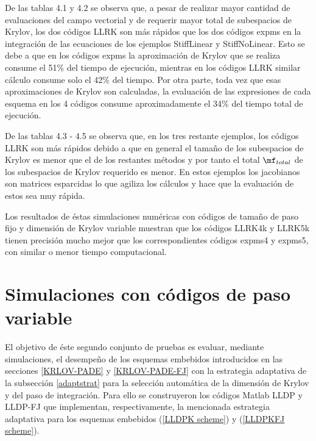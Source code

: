 De las tablas 4.1 y 4.2 se observa que, a pesar de realizar mayor cantidad de evaluaciones del campo vectorial y de requerir mayor total de subespacios de Krylov, los dos códigos LLRK son más rápidos que los dos códigos expms en la integración de las ecuaciones de los ejemplos StiffLinear y StiffNoLinear. Esto se debe a que en los códigos expms la aproximación de Krylov que se realiza consume el 51\% del tiempo de ejecución, mientras en los códigos LLRK similar cálculo consume solo el 42\% del tiempo. Por otra parte, toda vez que esas aproximaciones de Krylov son calculadas, la evaluación de las expresiones de cada esquema en los 4 códigos consume aproximadamente el 34\% del tiempo total de ejecución.

De las tablas 4.3 - 4.5 se observa que, en los tres restante ejemplos, los códigos LLRK son m\'as r\'apidos debido a que en general el tama\~no de los subespacios de Krylov es menor que el de los restantes m\'etodos y por tanto el total $\mf_{total}$ de los subespacios de Krylov requerido es menor. En estos ejemplos los jacobianos son matrices esparcidas lo que agiliza los c\'alculos y hace que la evaluaci\'on de estos sea muy r\'apida.


Los resultados de éstas simulaciones numéricas con códigos de tamaño de paso fijo y dimensión de Krylov variable muestran que los códigos LLRK4k y LLRK5k tienen precisión mucho mejor que los correspondientes c\'odigos expms4 y expms5, con similar o menor tiempo computacional.






%

\newpage

\section{Simulaciones con códigos de paso variable}\label{Seccion simulacion paso variable}
El objetivo de éste segundo conjunto de pruebas es evaluar, mediante simulaciones, el desempeño de los esquemas embebidos introducidos en las secciones \ref{KRLOV-PADE} y \ref{KRLOV-PADE-FJ} con la estrategia adaptativa de la subsección \ref{adaptstrat} para la selección automática de la dimensión de Krylov y del paso de integración. Para ello se construyeron los códigos Matlab LLDP y LLDP-FJ que implementan, respectivamente, la mencionada estrategia adaptativa para los esquemas embebidos (\ref{LLDPK scheme}) y (\ref{LLDPKFJ scheme}).

